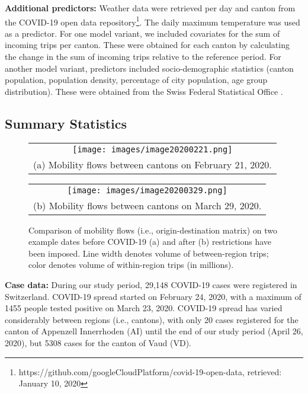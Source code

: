 \documentclass[sigconf, review = false, nonacm = true]{acmart}
\begin{document}
\textbf{Additional predictors:} Weather data were retrieved per day and canton from the COVID-19 open data repository\footnote{https://github.com/googleCloudPlatform/covid-19-open-data, retrieved: January 10, 2020}. The daily maximum temperature was used as a predictor. For one model variant, we included covariates for the sum of incoming trips per canton. These were obtained for each canton by calculating the change in the sum of incoming trips relative to the reference period. For another model variant,  predictors included socio-demographic statistics (canton population, population density, percentage of city population, age group distribution). These were obtained from the Swiss Federal Statistical Office \cite{office_population_2021}. 

\subsection{Summary Statistics}

\begin{figure}
  \centering
  \begin{tabular}{@{}c@{}}
  \label{before}
    \texttt{[image: images/image20200221.png]} \\[\abovecaptionskip]
    \small (a) Mobility flows between cantons on February 21, 2020.
  \end{tabular}

  \vspace{\floatsep}

  \begin{tabular}{@{}c@{}}
  \label{after}
    \texttt{[image: images/image20200329.png]} \\[\abovecaptionskip]
    \small (b) Mobility flows between cantons on March 29, 2020.
  \end{tabular}

  \caption[Caption for LOF]{Comparison of mobility flows (i.e., origin-destination matrix) on two example dates before COVID-19 (a) and after (b) restrictions have been imposed. Line width denotes volume of between-region trips; color denotes volume of within-region trips (in millions).}
\label{fig:mobilityFlows}
\end{figure}

\textbf{Case data:} During our study period, 29,148 COVID-19 cases were registered in Switzerland. COVID-19 spread started on February 24, 2020, with a maximum of 1455 people tested positive on March 23, 2020. COVID-19 spread has varied considerably between regions (i.e., cantons), with only 20 cases registered for the canton of Appenzell Innerrhoden (AI) until the end of our study period (April 26, 2020), but 5308 cases for the canton of Vaud (VD).
\end{document}
